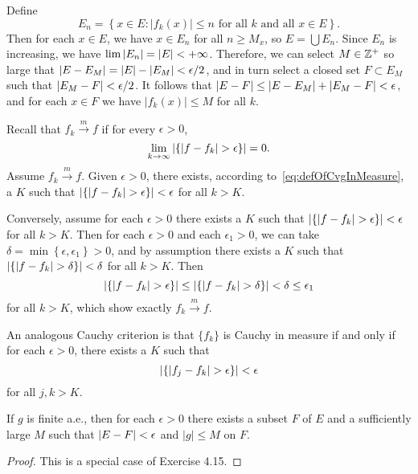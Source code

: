 
\begin{exercise}{4.15}
  Define
  \[
    E_n = \left\{ x \in E : \lvert f_k(x) \rvert \le n
    \text{ for all $k$ and all $x \in E$} \right\}.
  \]
  Then for each $x \in E$,
  we have $x \in E_n$ for all $n \ge M_x$,
  so $E = \bigcup E_n$.
  Since $E_n$ is increasing,
  we have $\lim \left\vert E_n\right\vert = \left\vert E\right\vert < +\infty$.
  Therefore, we can select $M \in \mathbb{Z}^+$ so large that
  $\left\vert E - E_M\right\vert = \left\vert E\right\vert - \left\vert E_M\right\vert < \epsilon/2$,
  and in turn select a closed set $F \subset E_M$ such that
  $\left\vert E_M - F\right\vert < \epsilon/2$.
  It follows that $\left\vert E - F\right\vert \le \left\vert E - E_M\right\vert + \left\vert E_M - F\right\vert < \epsilon$,
  and for each $x \in F$ we have
  $\lvert f_k(x) \rvert \le M$ for all $k$.
\end{exercise}

\begin{exercise}{4.16}
  Recall that $f_k \xrightarrow{m} f$ if for every $\epsilon > 0$,
  \begin{equation}
    \lim_{k \rightarrow \infty} \left\vert\left\{ \lvert f - f_k \rvert > \epsilon \right\}\right\vert = 0.
    \label{eq:defOfCvgInMeasure}
  \end{equation}
  Assume $f_k \xrightarrow{m} f$.
  Given $\epsilon > 0$,
  there exists, according to~\eqref{eq:defOfCvgInMeasure}, a $K$ such that
  $\left\vert\left\{ \lvert f - f_k \rvert > \epsilon \right\}\right\vert < \epsilon$
  for all $k > K$.

  Conversely, assume for each $\epsilon > 0$ there exists a $K$ such that
  $\left\vert\left\{ \lvert f - f_k \rvert > \epsilon \right\}\right\vert < \epsilon$
  for all $k > K$.
  Then for each $\epsilon > 0$ and each $\epsilon_1 > 0$,
  we can take $\delta = \min \left\{ \epsilon, \epsilon_1 \right\} > 0$,
  and by assumption there exists a $K$ such that
  $\left\vert\left\{ \lvert f - f_k \rvert > \delta \right\}\right\vert < \delta$
  for all $k > K$.
  Then
  \[
    \left\vert\left\{ \lvert f - f_k \rvert > \epsilon \right\}\right\vert
    \le \left\vert\left\{ \lvert f - f_k \rvert > \delta \right\}\right\vert
    < \delta \le \epsilon_1
  \]
  for all $k > K$, which show exactly $f_k \xrightarrow{m} f$.

  An analogous Cauchy criterion is that
  $\{f_k\}$ is Cauchy in measure if and only if
  for each $\epsilon > 0$,
  there exists a $K$ such that
  \[
    \left\vert\left\{ \lvert f_j - f_k \rvert > \epsilon \right\}\right\vert < \epsilon
  \]
  for all $j, k > K$.
\end{exercise}

\begin{lemma}
  If $g$ is finite a.e.,
  then for each $\epsilon > 0$
  there exists a subset $F$ of $E$ and a sufficiently large $M$ such that
  $\left\vert E - F\right\vert < \epsilon$ and $\lvert g \rvert \le M$ on $F$.
\end{lemma}
\begin{proof}
  This is a special case of Exercise 4.15.
\end{proof}

